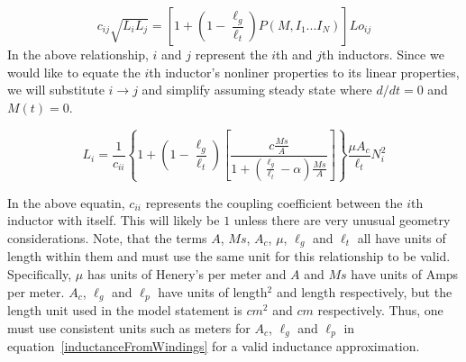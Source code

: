 \begin{equation}
 c_{ij} \sqrt{ L_{i} L_{j} } =  \left[1 + \left(1-\frac{\ell_g}{\ell_t}\right)P(M,I_{1} ... I_{N})\right] Lo_{ij}
\label{nonlinMIRelation2}
\end{equation}
In the above relationship, $i$ and $j$ represent the $i$th and $j$th inductors.  Since we would like to 
equate the $i$th inductor's nonliner properties to its linear properties, we will substitute $i\rightarrow j$ 
and simplify assuming steady state where $d/dt = 0$ and $M(t) = 0$.

\begin{equation}
L_{i} = \frac{1}{c_{ii}} \left\{ 1 + \left(1 - \frac{\ell_g}{\ell_t}  \right) 
  \left[\frac{c \frac{Ms}{A}}{1 + \left( \frac{\ell_g}{\ell_t} - \alpha\right) \frac{Ms}{A}} \right] \right\} \frac{\mu A_c}{\ell_t} N_i^2
  \label{inductanceFromWindings}
\end{equation}

In the above equatin, $c_{ii}$ represents the coupling coefficient between the $i$th inductor with itself.  
This will likely be $1$ unless there are very unusual geometry considerations.  Note, that the terms $A$, $Ms$, $A_c$, $\mu$,
$\ell_{g}$ and $\ell_{t}$ all have units of length within them and must use the same unit for this relationship 
to be valid.  Specifically, $\mu$ has units of Henery's per meter and $A$ and $Ms$ have units of Amps per meter.   
$A_c$, $\ell_{g}$ and $\ell_{p}$ have units of length$^2$ and length respectively, but the length unit used in 
the model statement is $cm^2$ and $cm$ respectively.  Thus, one must use consistent units such as meters 
for $A_c$, $\ell_{g}$ and $\ell_{p}$ in equation~\ref{inductanceFromWindings} for a valid inductance approximation.

